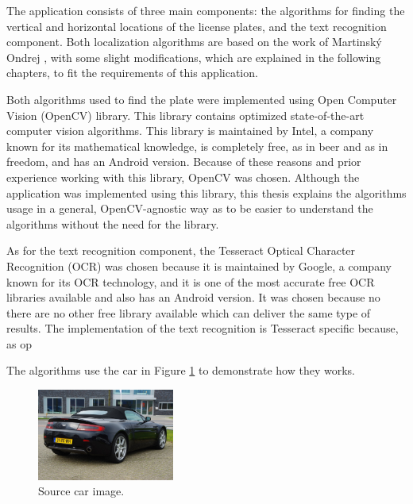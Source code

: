 
The application consists of three main components: the algorithms for finding the vertical and horizontal locations of the license plates, and the text recognition component. Both localization algorithms are based on the work of Martinský Ondrej \cite{ondrej2007algorithmic}, with some slight modifications, which are explained in the following chapters, to fit the requirements of this application. 

Both algorithms used to find the plate were implemented using Open Computer Vision (OpenCV) library. This library contains optimized state-of-the-art computer vision algorithms. This library is maintained by Intel, a company known for its mathematical knowledge, is completely free, as in beer and as in freedom, and has an Android version. Because of these reasons and prior experience working with this library, OpenCV was chosen. Although the application was implemented using this library, this thesis explains the algorithms usage in a general, OpenCV-agnostic way as to be easier to understand the algorithms without the need for the library.

As for the text recognition component, the Tesseract Optical Character Recognition (OCR) was chosen because  it is maintained by Google, a company known for its OCR technology, and it is one of the most accurate free OCR libraries available and also has an Android version. It was chosen because no there are no other free library available which can deliver the same type of results. The implementation of the text recognition is Tesseract specific because, as op

The algorithms use the car in Figure \ref{fig:car-source} to demonstrate how they works.

\begin{figure}[ht]
    \centering
    \includegraphics[width=0.40\textwidth]{plaatjes/car}
    \caption{Source car image. \cite{source-car-fig}}
    \label{fig:car-source}
\end{figure}%

